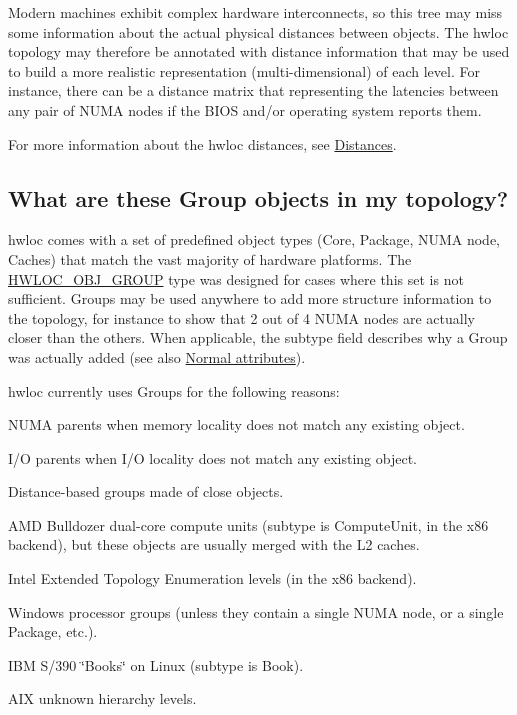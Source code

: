 Modern machines exhibit complex hardware interconnects, so this tree may miss some information about the actual physical distances between objects. The hwloc topology may therefore be annotated with distance information that may be used to build a more realistic representation (multi-\/dimensional) of each level. For instance, there can be a distance matrix that representing the latencies between any pair of N\+U\+MA nodes if the B\+I\+OS and/or operating system reports them.

For more information about the hwloc distances, see \hyperlink{a00387_topoattrs_distances}{Distances}.\hypertarget{a00394_faq_groups}{}\subsection{What are these Group objects in my topology?}\label{a00394_faq_groups}
hwloc comes with a set of predefined object types (Core, Package, N\+U\+MA node, Caches) that match the vast majority of hardware platforms. The \hyperlink{a00184_ggacd37bb612667dc437d66bfb175a8dc55a5269ef95be72f88465559d35c9b7ad56}{H\+W\+L\+O\+C\+\_\+\+O\+B\+J\+\_\+\+G\+R\+O\+UP} type was designed for cases where this set is not sufficient. Groups may be used anywhere to add more structure information to the topology, for instance to show that 2 out of 4 N\+U\+MA nodes are actually closer than the others. When applicable, the {\ttfamily subtype} field describes why a Group was actually added (see also \hyperlink{a00386_attributes_normal}{Normal attributes}).

hwloc currently uses Groups for the following reasons\+: 
\begin{DoxyItemize}
\item N\+U\+MA parents when memory locality does not match any existing object. 
\item I/O parents when I/O locality does not match any existing object. 
\item Distance-\/based groups made of close objects. 
\item A\+MD Bulldozer dual-\/core compute units ({\ttfamily subtype} is {\ttfamily Compute\+Unit}, in the x86 backend), but these objects are usually merged with the L2 caches. 
\item Intel Extended Topology Enumeration levels (in the x86 backend). 
\item Windows processor groups (unless they contain a single N\+U\+MA node, or a single Package, etc.). 
\item I\+BM S/390 \char`\"{}\+Books\char`\"{} on Linux ({\ttfamily subtype} is {\ttfamily Book}). 
\item A\+IX unknown hierarchy levels. 
\end{DoxyItemize}

